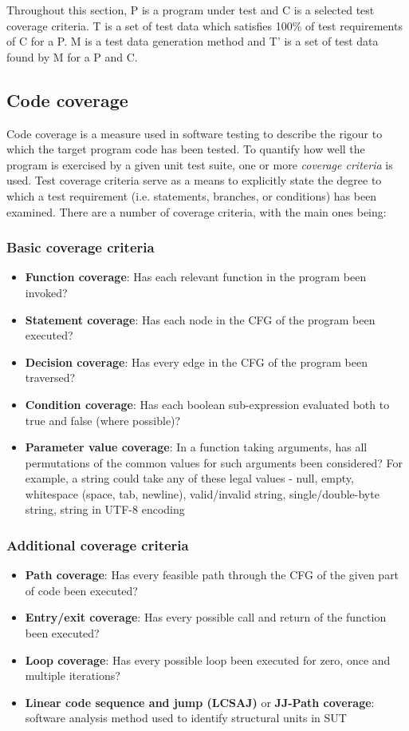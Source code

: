 \documentclass{icldt}
\numberwithin{equation}{section}       %
\begin{document}
{{Throughout this section, P is a program under test and C is a selected test coverage criteria. T is a set of test data which satisfies 100\% of test requirements of C for a P. M is a test data generation method and T' is a set of test data found by M for a P and C.

\subsection{Code coverage}
Code coverage is a measure used in software testing to describe the rigour to which the target program code has been tested. To quantify how well the program is exercised by a given unit test suite, one or more \emph{coverage criteria} is used. Test coverage criteria serve as a means to explicitly state the degree to which a test requirement (i.e. statements, branches, or conditions) has been examined. There are a number of coverage criteria, with the main ones being:

\subsubsection{Basic coverage criteria}
\begin{itemize}
    \item \textbf{Function coverage}: Has each relevant function in the program been invoked?
    \item \textbf{Statement coverage}: Has each node in the CFG of the program been executed?
    \item \textbf{Decision coverage}: Has every edge in the CFG of the program been traversed?
    \item \textbf{Condition coverage}: Has each boolean sub-expression evaluated both to true and false (where possible)?
    \item \textbf{Parameter value coverage}: In a function taking arguments, has all permutations of the common values for such arguments been considered? For example, a string could take any of these legal values - null, empty, whitespace (space, tab, newline), valid/invalid string, single/double-byte string, string in UTF-8 encoding
\end{itemize}

\subsubsection{Additional coverage criteria}
\begin{itemize}
    \item \textbf{Path coverage}: Has every feasible path through the CFG of the given part of code been executed?
    \item \textbf{Entry/exit coverage}: Has every possible call and return of the function been executed?
    \item \textbf{Loop coverage}: Has every possible loop been executed for zero, once and multiple iterations?
    \item \textbf{Linear code sequence and jump (LCSAJ)} or \textbf{JJ-Path coverage}: software analysis method used to identify structural units in SUT
\end{itemize}

}}
\end{document}
